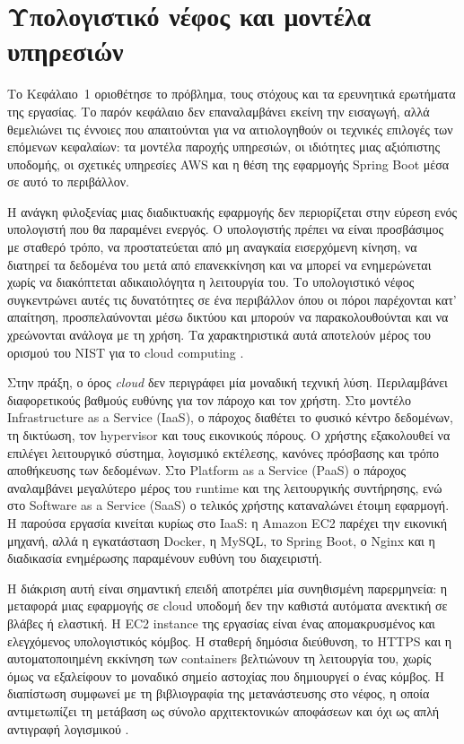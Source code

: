 \section{Υπολογιστικό νέφος και μοντέλα υπηρεσιών}

Το Κεφάλαιο~1 οριοθέτησε το πρόβλημα, τους στόχους και τα ερευνητικά
ερωτήματα της εργασίας. Το παρόν κεφάλαιο δεν επαναλαμβάνει εκείνη την
εισαγωγή, αλλά θεμελιώνει τις έννοιες που απαιτούνται για να αιτιολογηθούν
οι τεχνικές επιλογές των επόμενων κεφαλαίων: τα μοντέλα παροχής υπηρεσιών,
οι ιδιότητες μιας αξιόπιστης υποδομής, οι σχετικές υπηρεσίες AWS και η θέση
της εφαρμογής Spring Boot μέσα σε αυτό το περιβάλλον.

Η ανάγκη φιλοξενίας μιας διαδικτυακής εφαρμογής δεν περιορίζεται στην εύρεση
ενός υπολογιστή που θα παραμένει ενεργός. Ο υπολογιστής πρέπει να είναι
προσβάσιμος με σταθερό τρόπο, να προστατεύεται από μη αναγκαία εισερχόμενη
κίνηση, να διατηρεί τα δεδομένα του μετά από επανεκκίνηση και να μπορεί να
ενημερώνεται χωρίς να διακόπτεται αδικαιολόγητα η λειτουργία του. Το
υπολογιστικό νέφος συγκεντρώνει αυτές τις δυνατότητες σε ένα περιβάλλον όπου
οι πόροι παρέχονται κατ' απαίτηση, προσπελαύνονται μέσω δικτύου και μπορούν να
παρακολουθούνται και να χρεώνονται ανάλογα με τη χρήση. Τα χαρακτηριστικά
αυτά αποτελούν μέρος του ορισμού του NIST για το cloud computing
\cite{mell2011nist}.

Στην πράξη, ο όρος \emph{cloud} δεν περιγράφει μία μοναδική τεχνική λύση.
Περιλαμβάνει διαφορετικούς βαθμούς ευθύνης για τον πάροχο και τον χρήστη. Στο
μοντέλο Infrastructure as a Service (IaaS), ο πάροχος διαθέτει το φυσικό
κέντρο δεδομένων, τη δικτύωση, τον hypervisor και τους εικονικούς πόρους. Ο
χρήστης εξακολουθεί να επιλέγει λειτουργικό σύστημα, λογισμικό εκτέλεσης,
κανόνες πρόσβασης και τρόπο αποθήκευσης των δεδομένων. Στο Platform as a
Service (PaaS) ο πάροχος αναλαμβάνει μεγαλύτερο μέρος του runtime και της
λειτουργικής συντήρησης, ενώ στο Software as a Service (SaaS) ο τελικός
χρήστης καταναλώνει έτοιμη εφαρμογή. Η παρούσα εργασία κινείται κυρίως στο
IaaS: η Amazon EC2 παρέχει την εικονική μηχανή, αλλά η εγκατάσταση Docker, η
MySQL, το Spring Boot, ο Nginx και η διαδικασία ενημέρωσης παραμένουν ευθύνη
του διαχειριστή.

Η διάκριση αυτή είναι σημαντική επειδή αποτρέπει μία συνηθισμένη
παρερμηνεία: η μεταφορά μιας εφαρμογής σε cloud υποδομή δεν την καθιστά
αυτόματα ανεκτική σε βλάβες ή ελαστική. Η EC2 instance της εργασίας είναι
ένας απομακρυσμένος και ελεγχόμενος υπολογιστικός κόμβος. Η σταθερή δημόσια
διεύθυνση, το HTTPS και η αυτοματοποιημένη εκκίνηση των containers βελτιώνουν
τη λειτουργία του, χωρίς όμως να εξαλείφουν το μοναδικό σημείο αστοχίας που
δημιουργεί ο ένας κόμβος. Η διαπίστωση συμφωνεί με τη βιβλιογραφία της
μετανάστευσης στο νέφος, η οποία αντιμετωπίζει τη μετάβαση ως σύνολο
αρχιτεκτονικών αποφάσεων και όχι ως απλή αντιγραφή λογισμικού
\cite{jamshidi2013migration}.

